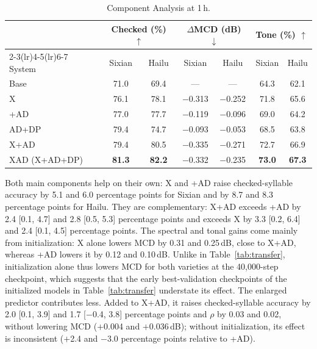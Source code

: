 \documentclass[conference,a4paper]{IEEEtran}
\begin{document}
\begin{table}[H]
\centering
\caption{Component Analysis at 1\,h.}
\label{tab:ablation}
\footnotesize
\setlength{\tabcolsep}{2.6pt}
\begin{tabular}{lcccccc}
\toprule
 & \multicolumn{2}{c}{Checked (\%) $\uparrow$} & \multicolumn{2}{c}{$\Delta$MCD (dB) $\downarrow$} & \multicolumn{2}{c}{Tone (\%) $\uparrow$} \\
\cmidrule(lr){2-3}\cmidrule(lr){4-5}\cmidrule(lr){6-7}
System & Sixian & Hailu & Sixian & Hailu & Sixian & Hailu \\
\midrule
Base          & 71.0 & 69.4 & ---          & ---          & 64.3 & 62.1 \\
X             & 76.1 & 78.1 & $-$0.313     & $-$0.252     & 71.8 & 65.6 \\
+AD           & 77.0 & 77.7 & $-$0.119     & $-$0.096     & 69.0 & 64.2 \\
AD+DP         & 79.4 & 74.7 & $-$0.093     & $-$0.053     & 68.5 & 63.8 \\
X+AD          & 79.4 & 80.5 & $-$0.335     & $-$0.271     & 72.7 & 66.9 \\
XAD (X+AD+DP) & \textbf{81.3} & \textbf{82.2} & $-$0.332 & $-$0.235 & \textbf{73.0} & \textbf{67.3} \\
\bottomrule
\end{tabular}
\end{table}

Both main components help on their own: X and +AD raise checked-syllable accuracy by 5.1 and 6.0 percentage points for Sixian and by 8.7 and 8.3 percentage points for Hailu. They are complementary: X+AD exceeds +AD by 2.4 [0.1, 4.7] and 2.8 [0.5, 5.3] percentage points and exceeds X by 3.3 [0.2, 6.4] and 2.4 [0.1, 4.5] percentage points. The spectral and tonal gains come mainly from initialization: X alone lowers MCD by 0.31 and 0.25\,dB, close to X+AD, whereas +AD lowers it by 0.12 and 0.10\,dB. Unlike in Table~\ref{tab:transfer}, initialization alone thus lowers MCD for both varieties at the 40{,}000-step checkpoint, which suggests that the early best-validation checkpoints of the initialized models in Table~\ref{tab:transfer} understate its effect. The enlarged predictor contributes less. Added to X+AD, it raises checked-syllable accuracy by 2.0 [0.1, 3.9] and 1.7 [$-$0.4, 3.8] percentage points and $\rho$ by 0.03 and 0.02, without lowering MCD ($+$0.004 and $+$0.036\,dB); without initialization, its effect is inconsistent ($+$2.4 and $-$3.0 percentage points relative to +AD).
\end{document}
